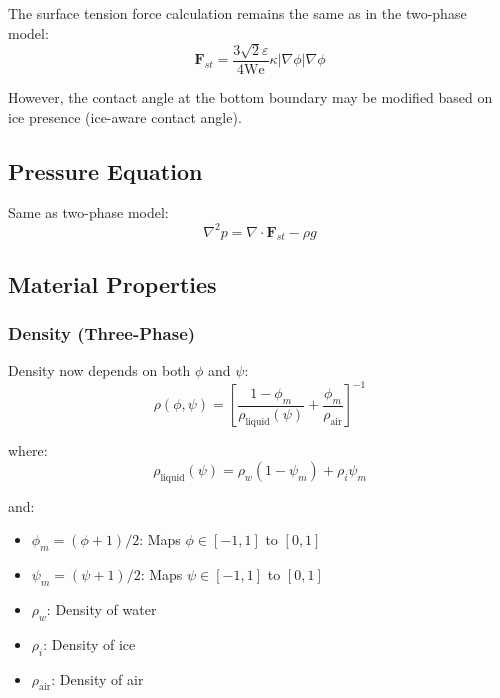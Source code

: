 \documentclass[12pt]{article}
\begin{document}
The surface tension force calculation remains the same as in the two-phase model:
\begin{equation}
\mathbf{F}_{st} = \frac{3\sqrt{2}\varepsilon}{4\text{We}} \kappa |\nabla \phi| \nabla \phi
\label{eq:surface_tension_three}
\end{equation}

However, the contact angle at the bottom boundary may be modified based on ice presence (ice-aware contact angle).

\subsection{Pressure Equation}

Same as two-phase model:
\begin{equation}
\nabla^2 p = \nabla \cdot \mathbf{F}_{st} - \rho g
\label{eq:pressure_equation_three}
\end{equation}

\subsection{Material Properties}

\subsubsection{Density (Three-Phase)}

Density now depends on both $\phi$ and $\psi$:
\begin{equation}
\rho(\phi, \psi) = \left[ \frac{1 - \phi_m}{\rho_{\text{liquid}}(\psi)} + \frac{\phi_m}{\rho_{\text{air}}} \right]^{-1}
\label{eq:density_three}
\end{equation}

where:
\begin{equation}
\rho_{\text{liquid}}(\psi) = \rho_w (1 - \psi_m) + \rho_i \psi_m
\end{equation}

and:
\begin{itemize}
    \item $\phi_m = (\phi + 1)/2$: Maps $\phi \in [-1, 1]$ to $[0, 1]$
    \item $\psi_m = (\psi + 1)/2$: Maps $\psi \in [-1, 1]$ to $[0, 1]$
    \item $\rho_w$: Density of water
    \item $\rho_i$: Density of ice
    \item $\rho_{\text{air}}$: Density of air
\end{itemize}
\end{document}
